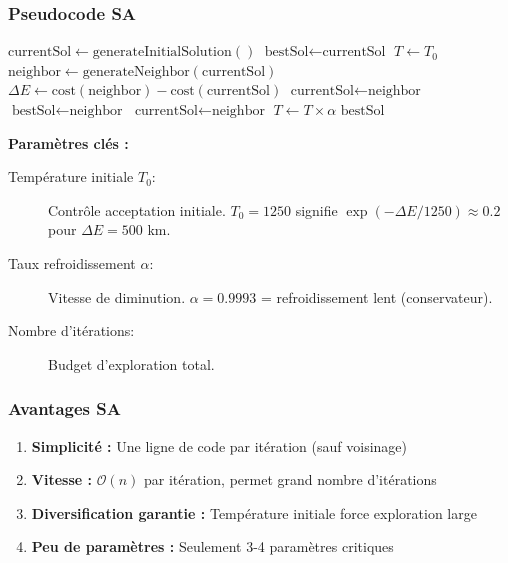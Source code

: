 \documentclass[12pt,a4paper,twoside]{report}
\begin{document}
\subsubsection{Pseudocode SA}

\begin{algorithm}[H]
    \caption{Simulated Annealing pour VRPTW}
    \begin{algorithmic}
        \State $\text{currentSol} \gets \text{generateInitialSolution}()$
        \State $\text{bestSol} \gets \text{currentSol}$
        \State $T \gets T_0$ 
        \State $\text{neighbor} \gets \text{generateNeighbor}(\text{currentSol})$
        \State $\Delta E \gets \text{cost}(\text{neighbor}) - \text{cost}(\text{currentSol})$
        \State $\text{currentSol} \gets \text{neighbor}$
        \State $\text{bestSol} \gets \text{neighbor}$
        \EndIf
        \Else
        \State {}
        \State $\text{currentSol} \gets \text{neighbor}$
        \EndIf
        \EndIf
        \State $T \gets T \times \alpha$ 
        \EndFor
        \State \Return $\text{bestSol}$
    \end{algorithmic}
\end{algorithm}

\textbf{Paramètres clés :}

\begin{description}
    \item[Température initiale $T_0$:] Contrôle acceptation initiale. $T_0 = 1250$
          signifie $\exp(-\Delta E / 1250) \approx 0.2$ pour $\Delta E = 500$ km.

    \item[Taux refroidissement $\alpha$:] Vitesse de diminution. $\alpha = 0.9993$ =
          refroidissement lent (conservateur).

    \item[Nombre d'itérations:] Budget d'exploration total.
\end{description}

\subsubsection{Avantages SA}

\begin{enumerate}
    \item \textbf{Simplicité :} Une ligne de code par itération (sauf voisinage)
    \item \textbf{Vitesse :} $\mathcal{O}(n)$ par itération, permet grand nombre d'itérations
    \item \textbf{Diversification garantie :} Température initiale force exploration large
    \item \textbf{Peu de paramètres :} Seulement 3-4 paramètres critiques
\end{enumerate}
\end{document}
